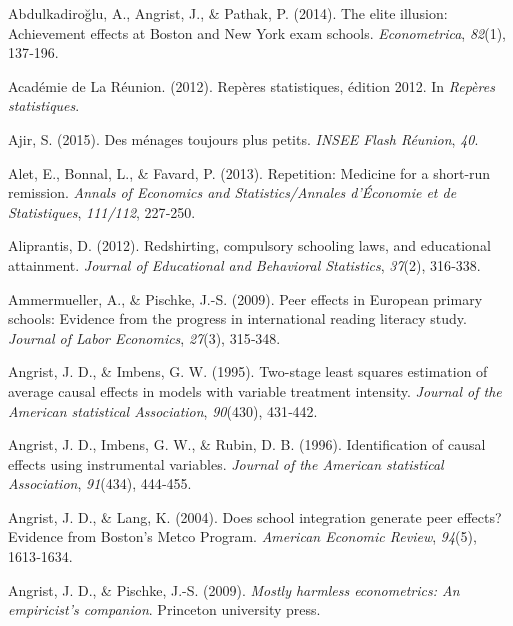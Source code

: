 \documentclass[
]{book}
\newlength{\cslhangindent}
\newlength{\cslentryspacingunit} %
\newenvironment{CSLReferences}[2] %
 {%
  \setlength{\parindent}{0pt}
  \ifodd #1
  \let\oldpar\par
  \def\par{\hangindent=\cslhangindent\oldpar}
  \fi
  \setlength{\parskip}{#2\cslentryspacingunit}
 }%
 {}
\begin{document}
\hypertarget{refs}{}
\begin{CSLReferences}{1}{2}
\leavevmode{}%
Abdulkadiroğlu, A., Angrist, J., \& Pathak, P. (2014). The elite illusion: Achievement effects at Boston and New York exam schools. \emph{Econometrica}, \emph{82}(1), 137‑196.

\leavevmode{}%
Académie de La Réunion. (2012). Repères statistiques, édition 2012. In \emph{Repères statistiques}.

\leavevmode{}%
Ajir, S. (2015). Des ménages toujours plus petits. \emph{INSEE Flash Réunion}, \emph{40}.

\leavevmode{}%
Alet, E., Bonnal, L., \& Favard, P. (2013). Repetition: Medicine for a short-run remission. \emph{Annals of Economics and Statistics/Annales d'Économie et de Statistiques}, \emph{111/112}, 227‑250.

\leavevmode{}%
Aliprantis, D. (2012). Redshirting, compulsory schooling laws, and educational attainment. \emph{Journal of Educational and Behavioral Statistics}, \emph{37}(2), 316‑338.

\leavevmode{}%
Ammermueller, A., \& Pischke, J.-S. (2009). Peer effects in European primary schools: Evidence from the progress in international reading literacy study. \emph{Journal of Labor Economics}, \emph{27}(3), 315‑348.

\leavevmode{}%
Angrist, J. D., \& Imbens, G. W. (1995). Two-stage least squares estimation of average causal effects in models with variable treatment intensity. \emph{Journal of the American statistical Association}, \emph{90}(430), 431‑442.

\leavevmode{}%
Angrist, J. D., Imbens, G. W., \& Rubin, D. B. (1996). Identification of causal effects using instrumental variables. \emph{Journal of the American statistical Association}, \emph{91}(434), 444‑455.

\leavevmode{}%
Angrist, J. D., \& Lang, K. (2004). Does school integration generate peer effects? Evidence from Boston's Metco Program. \emph{American Economic Review}, \emph{94}(5), 1613‑1634.

\leavevmode{}%
Angrist, J. D., \& Pischke, J.-S. (2009). \emph{Mostly harmless econometrics: An empiricist's companion}. Princeton university press.


\end{CSLReferences}
\end{document}
